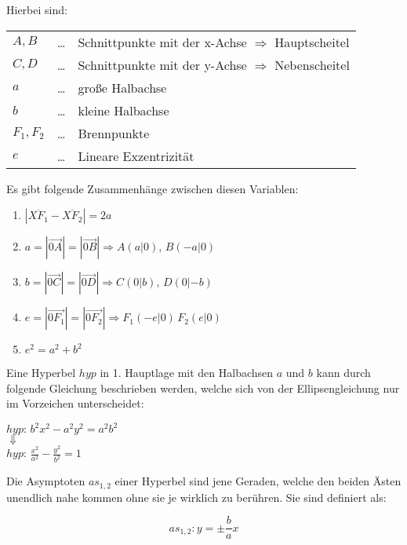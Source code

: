 Hierbei sind:

\begin{tabular}{l c l}
	$A, B$ & \ldots & Schnittpunkte mit der x-Achse $\Rightarrow$ Hauptscheitel\\
	$C, D$ & \ldots &  Schnittpunkte mit der y-Achse $\Rightarrow$ Nebenscheitel\\ 
	$a$ & \ldots & gro\ss{}e Halbachse\\
	$b$ & \ldots & kleine Halbachse \\ 
	$F_{1}, F_{2}$ & \ldots & Brennpunkte\\
	$e$ & \ldots & Lineare Exzentrizit\"{a}t\\
\end{tabular}

Es gibt folgende Zusammenh\"{a}nge zwischen diesen Variablen:

\begin{enumerate}
	\item $|\overbar{XF_{1}} - \overbar{XF_{2}}| = 2a$
	\item $a = |\vec{0A}| = |\vec{0B}| \Rightarrow A (a | 0),\, B (-a | 0)$
	\item $b = |\vec{0C}| = |\vec{0D}| \Rightarrow C (0 | b),\, D (0 | -b)$
	\item $e = |\vec{0F_{1}}| = |\vec{0F_{2}}| \Rightarrow F_{1} (-e | 0)\, F_{2} (e | 0)$
	\item $e^2 = a^2 + b^2$
\end{enumerate}

Eine Hyperbel $hyp$ in 1. Hauptlage mit den Halbachsen $a$ und $b$ kann durch folgende Gleichung beschrieben werden, welche sich von der Ellipsengleichung nur im Vorzeichen unterscheidet:

\begin{table}[h!]
	\begin{center}
		$hyp:\, b^2x^2 - a^2y^2 = a^2b^2$\\
		$\Downarrow$\\
		$hyp:\, \frac{x^2}{a^2} - \frac{y^2}{b^2} = 1$
	\end{center}
\end{table}

Die Asymptoten $as_{1, 2}$ einer Hyperbel sind jene Geraden, welche den beiden \"{A}sten unendlich nahe kommen ohne sie je wirklich zu ber\"{u}hren. Sie sind definiert als:

$$as_{1, 2}: y = \pm \frac{b}{a} x$$

